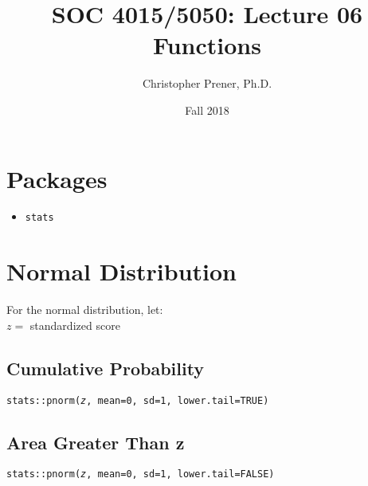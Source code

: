 \documentclass{tufte-handout}
\title{SOC 4015/5050: Lecture 06 Functions}
\author{Christopher Prener, Ph.D.}
\date{Fall 2018}
\newenvironment{subs}
  {\adjustwidth{3em}{0pt}}
  {\endadjustwidth}
\begin{document}
\maketitle %

\vspace{5mm}
\section{Packages}
\begin{itemize}
\item \texttt{stats}
\end{itemize}

\vspace{5mm}
\section{Normal Distribution}
For the normal distribution, let: \\
\noindent $z =$ standardized score\\

\begin{subs}

\vspace{3mm}
\subsection{Cumulative Probability}
\noindent \texttt{stats::}{\color{red}\texttt{pnorm}}\texttt{(\textit{z}, mean=0, sd=1, lower.tail=TRUE)}\\

\vspace{3mm}
\subsection{Area Greater Than z}
\noindent \texttt{stats::}{\color{red}\texttt{pnorm}}\texttt{(\textit{z}, mean=0, sd=1, lower.tail=FALSE)}\\

\end{subs}

\end{document}
